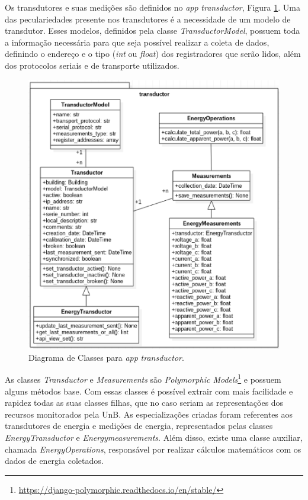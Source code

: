 Os transdutores e suas medições são definidos no \textit{app} \textit{transductor}, Figura \ref{transductor}. Uma das peculariedades presente nos transdutores é a necessidade de um modelo de transdutor. Esses modelos, definidos pela classe \textit{TransductorModel}, possuem toda a informação necessária para que seja possível realizar a coleta de dados, definindo o endereço e o tipo (\textit{int} ou \textit{float}) dos registradores que serão lidos, além dos protocolos seriais e de transporte utilizados.

\begin{figure}[!h]
    \centering
    \includegraphics[keepaspectratio=true,scale=0.7]{figuras/transductor.eps}
    \caption{Diagrama de Classes para \textit{app} \textit{transductor}.}
    \label{transductor}
\end{figure}

As classes \textit{Transductor} e \textit{Measurements} são \textit{Polymorphic Models}\footnote{\url{https://django-polymorphic.readthedocs.io/en/stable/}} e possuem alguns métodos base. Com essas classes é possível extrair com mais facilidade e rapidez todas as suas classes filhas, que no caso seriam as representações dos recursos monitorados pela UnB. As especializações criadas foram referentes aos transdutores de energia e medições de energia, representados pelas classes \textit{EnergyTransductor} e \textit{Energymeasurements}. Além disso, existe uma classe auxiliar, chamada \textit{EnergyOperations}, responsável por realizar cálculos matemáticos com os dados de energia coletados.

